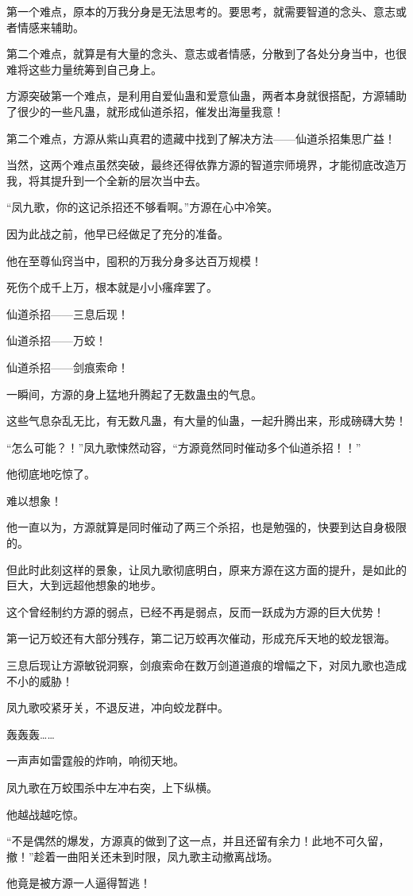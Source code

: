 \begin{this_body}
第一个难点，原本的万我分身是无法思考的。要思考，就需要智道的念头、意志或者情感来辅助。

第二个难点，就算是有大量的念头、意志或者情感，分散到了各处分身当中，也很难将这些力量统筹到自己身上。

方源突破第一个难点，是利用自爱仙蛊和爱意仙蛊，两者本身就很搭配，方源辅助了很少的一些凡蛊，就形成仙道杀招，催发出海量我意！

第二个难点，方源从紫山真君的遗藏中找到了解决方法——仙道杀招集思广益！

当然，这两个难点虽然突破，最终还得依靠方源的智道宗师境界，才能彻底改造万我，将其提升到一个全新的层次当中去。

“凤九歌，你的这记杀招还不够看啊。”方源在心中冷笑。

因为此战之前，他早已经做足了充分的准备。

他在至尊仙窍当中，囤积的万我分身多达百万规模！

死伤个成千上万，根本就是小小瘙痒罢了。

仙道杀招——三息后现！

仙道杀招——万蛟！

仙道杀招——剑痕索命！

一瞬间，方源的身上猛地升腾起了无数蛊虫的气息。

这些气息杂乱无比，有无数凡蛊，有大量的仙蛊，一起升腾出来，形成磅礴大势！

“怎么可能？！”凤九歌悚然动容，“方源竟然同时催动多个仙道杀招！！”

他彻底地吃惊了。

难以想象！

他一直以为，方源就算是同时催动了两三个杀招，也是勉强的，快要到达自身极限的。

但此时此刻这样的景象，让凤九歌彻底明白，原来方源在这方面的提升，是如此的巨大，大到远超他想象的地步。

这个曾经制约方源的弱点，已经不再是弱点，反而一跃成为方源的巨大优势！

第一记万蛟还有大部分残存，第二记万蛟再次催动，形成充斥天地的蛟龙银海。

三息后现让方源敏锐洞察，剑痕索命在数万剑道道痕的增幅之下，对凤九歌也造成不小的威胁！

凤九歌咬紧牙关，不退反进，冲向蛟龙群中。

轰轰轰……

一声声如雷霆般的炸响，响彻天地。

凤九歌在万蛟围杀中左冲右突，上下纵横。

他越战越吃惊。

“不是偶然的爆发，方源真的做到了这一点，并且还留有余力！此地不可久留，撤！”趁着一曲阳关还未到时限，凤九歌主动撤离战场。

他竟是被方源一人逼得暂逃！

\end{this_body}

